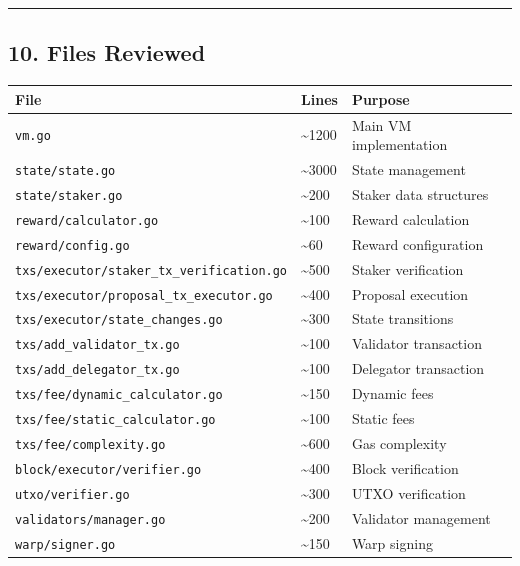 \documentclass[
]{article}
\newcounter{none} %
\begin{document}
\begin{center}\rule{0.5\linewidth}{0.5pt}\end{center}

\subsection{10. Files Reviewed}\label{10-files-reviewed}

{\def\LTcaptype{none} %
\begin{longtable}[]{@{}lll@{}}
\toprule\noalign{}
File & Lines & Purpose \\
\midrule\noalign{}
\endhead
\bottomrule\noalign{}
\endlastfoot
\texttt{vm.go} & \textasciitilde1200 & Main VM implementation \\
\texttt{state/state.go} & \textasciitilde3000 & State management \\
\texttt{state/staker.go} & \textasciitilde200 & Staker data
structures \\
\texttt{reward/calculator.go} & \textasciitilde100 & Reward
calculation \\
\texttt{reward/config.go} & \textasciitilde60 & Reward configuration \\
\texttt{txs/executor/staker\_tx\_verification.go} & \textasciitilde500 &
Staker verification \\
\texttt{txs/executor/proposal\_tx\_executor.go} & \textasciitilde400 &
Proposal execution \\
\texttt{txs/executor/state\_changes.go} & \textasciitilde300 & State
transitions \\
\texttt{txs/add\_validator\_tx.go} & \textasciitilde100 & Validator
transaction \\
\texttt{txs/add\_delegator\_tx.go} & \textasciitilde100 & Delegator
transaction \\
\texttt{txs/fee/dynamic\_calculator.go} & \textasciitilde150 & Dynamic
fees \\
\texttt{txs/fee/static\_calculator.go} & \textasciitilde100 & Static
fees \\
\texttt{txs/fee/complexity.go} & \textasciitilde600 & Gas complexity \\
\texttt{block/executor/verifier.go} & \textasciitilde400 & Block
verification \\
\texttt{utxo/verifier.go} & \textasciitilde300 & UTXO verification \\
\texttt{validators/manager.go} & \textasciitilde200 & Validator
management \\
\texttt{warp/signer.go} & \textasciitilde150 & Warp signing \\
\end{longtable}
}
\end{document}
